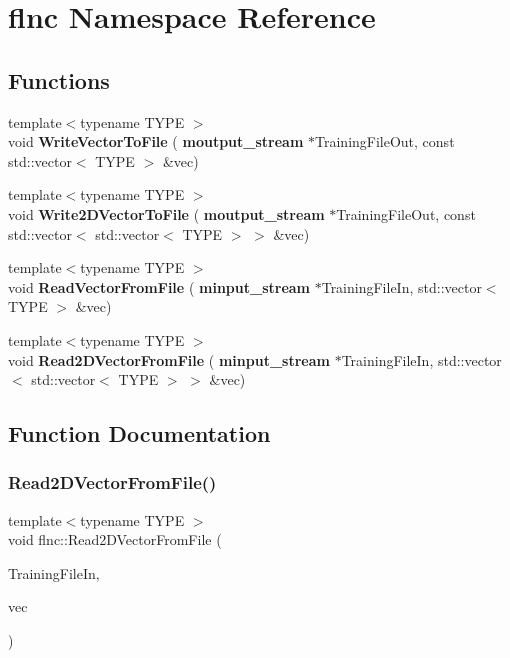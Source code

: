\section{flnc Namespace Reference}
\label{namespaceflnc}
\subsection*{Functions}
\begin{DoxyCompactItemize}
\item 
{\footnotesize template$<$typename T\+Y\+PE $>$ }\\void \textbf{ Write\+Vector\+To\+File} (\textbf{ moutput\+\_\+stream} $\ast$Training\+File\+Out, const std\+::vector$<$ T\+Y\+PE $>$ \&vec)
\item 
{\footnotesize template$<$typename T\+Y\+PE $>$ }\\void \textbf{ Write2\+D\+Vector\+To\+File} (\textbf{ moutput\+\_\+stream} $\ast$Training\+File\+Out, const std\+::vector$<$ std\+::vector$<$ T\+Y\+PE $>$ $>$ \&vec)
\item 
{\footnotesize template$<$typename T\+Y\+PE $>$ }\\void \textbf{ Read\+Vector\+From\+File} (\textbf{ minput\+\_\+stream} $\ast$Training\+File\+In, std\+::vector$<$ T\+Y\+PE $>$ \&vec)
\item 
{\footnotesize template$<$typename T\+Y\+PE $>$ }\\void \textbf{ Read2\+D\+Vector\+From\+File} (\textbf{ minput\+\_\+stream} $\ast$Training\+File\+In, std\+::vector$<$ std\+::vector$<$ T\+Y\+PE $>$ $>$ \&vec)
\end{DoxyCompactItemize}


\subsection{Function Documentation}
\mbox{\label{namespaceflnc_a43f11ba9f2a94bcf4e8680f806a54a47}} 
\subsubsection{Read2\+D\+Vector\+From\+File()}
{\footnotesize\ttfamily template$<$typename T\+Y\+PE $>$ \\
void flnc\+::\+Read2\+D\+Vector\+From\+File (\begin{DoxyParamCaption}\item[{\textbf{ minput\+\_\+stream} $\ast$}]{Training\+File\+In,  }\item[{std\+::vector$<$ std\+::vector$<$ T\+Y\+PE $>$ $>$ \&}]{vec }\end{DoxyParamCaption})}


